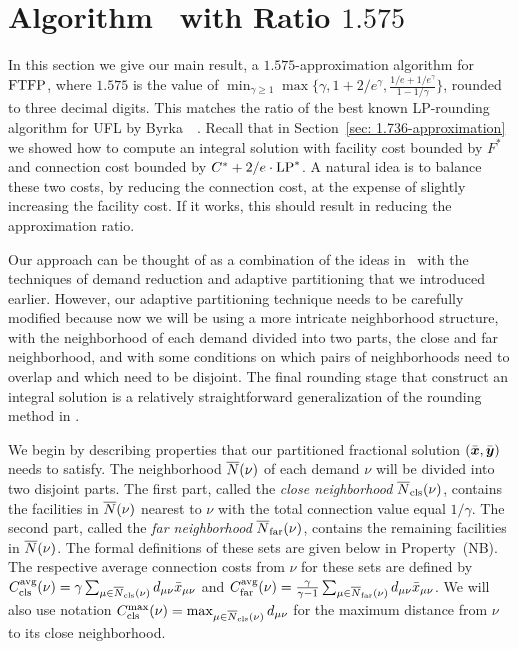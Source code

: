 
\section{Algorithm~{\EBGS} with Ratio $1.575$}\label{sec: 1.575-approximation}

In this section we give our main result, a $1.575$-approximation algorithm
for $\mbox{\rm FTFP}$, where $1.575$ is the value of
 $\min_{\gamma\geq 1}\max\{\gamma,
  1+2/e^\gamma, \frac{1/e+1/e^\gamma}{1-1/\gamma}\}$, rounded to three
decimal digits. This matches the ratio of the best known LP-rounding
algorithm for UFL by Byrka~{\etal}~\cite{ByrkaGS10}. Recall that in
Section~\ref{sec: 1.736-approximation} we showed how to compute an integral
solution with facility cost bounded by $F^\ast$ and
connection cost bounded by $C^\ast + 2/e\cdot\mbox{\rm LP}^\ast$. A
natural idea is to balance these two costs, by reducing the connection
cost, at the expense of slightly increasing the facility cost. If it works,
this should result in reducing the approximation ratio.

Our approach can be thought of as a combination of the ideas in~\cite{ByrkaGS10}
with the techniques of demand reduction and adaptive partitioning that we
introduced earlier. However, our adaptive partitioning technique needs to 
be carefully modified because now we will be using a more intricate neighborhood 
structure, with the neighborhood of each demand divided into two parts, 
the close and far neighborhood, and with some conditions on which pairs of neighborhoods
need to overlap and which need to be disjoint. The final rounding
stage that construct an integral solution is a relatively
straightforward generalization of the rounding method in \cite{ByrkaGS10}.

We begin by describing properties that our partitioned fractional
solution $(\bar{\boldsymbol{x}},\bar{\boldsymbol{y}})$ needs to satisfy. The neighborhood
${\overline{N}}(\nu)$ of each demand $\nu$ will be divided into two disjoint parts.
The first part, called the \emph{close neighborhood} ${\overline{N}}_{\text{cls}}(\nu)$,
contains the facilities in ${\overline{N}}(\nu)$ nearest to $\nu$ with the total
connection value equal $1/\gamma$. The second part,
called the \emph{far neighborhood} ${\overline{N}}_{\text{far}}(\nu)$, contains the 
remaining facilities in ${\overline{N}}(\nu)$. The formal definitions of
these sets  are given below in Property~(NB). 
The respective average connection costs from $\nu$ for these sets are defined by
$C_{\text{cls}}^{{\mbox{\scriptsize\rm avg}}}(\nu)=\gamma\sum_{\mu\in{\overline{N}}_{\text{cls}}(\nu)}
d_{\mu\nu}{\bar x}_{\mu\nu}$ and
$C_{\text{far}}^{{\mbox{\scriptsize\rm avg}}}(\nu)=\frac{\gamma}{\gamma-1}\sum_{\mu\in{\overline{N}}_{\text{far}}(\nu)}
d_{\mu\nu}{\bar x}_{\mu\nu}$. We will
also use notation $C_{\text{cls}}^{\max}(\nu)=\max_{\mu\in{\overline{N}}_{\text{cls}}(\nu)}
d_{\mu\nu}$ for the maximum distance from $\nu$ to its close neighborhood.

